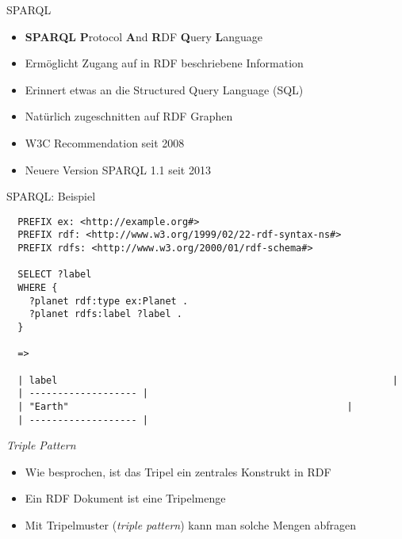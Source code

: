 \documentclass{beamer}
\begin{document}
\begin{frame}{SPARQL}

	\begin{itemize}
		\item \textbf{SPARQL} \textbf{P}rotocol \textbf{A}nd \textbf{R}DF \textbf{Q}uery \textbf{L}anguage
		\item Ermöglicht Zugang auf in RDF beschriebene Information
		\item Erinnert etwas an die Structured Query Language (SQL)
		\item Natürlich zugeschnitten auf RDF Graphen
		\item W3C Recommendation seit 2008
		\item Neuere Version SPARQL 1.1 seit 2013
	\end{itemize}
		
\end{frame}

\begin{frame}[fragile]{SPARQL: Beispiel}

	\small
	\begin{lstlisting}
  PREFIX ex: <http://example.org#> 
  PREFIX rdf: <http://www.w3.org/1999/02/22-rdf-syntax-ns#>
  PREFIX rdfs: <http://www.w3.org/2000/01/rdf-schema#>
	
  SELECT ?label
  WHERE {
    ?planet rdf:type ex:Planet .
    ?planet rdfs:label ?label .
  }
  
  =>
  
  | label															|
  | ------------------- |
  | "Earth"													|			
  | ------------------- |
	\end{lstlisting}
	
\end{frame}

\begin{frame}{\emph{Triple Pattern}}
	
	\begin{itemize}
		\item Wie besprochen, ist das Tripel ein zentrales Konstrukt in RDF
		\item Ein RDF Dokument ist eine Tripelmenge
		\item Mit Tripelmuster (\emph{triple pattern}) kann man solche Mengen abfragen
	\end{itemize}
	
\end{frame}
\end{document}
